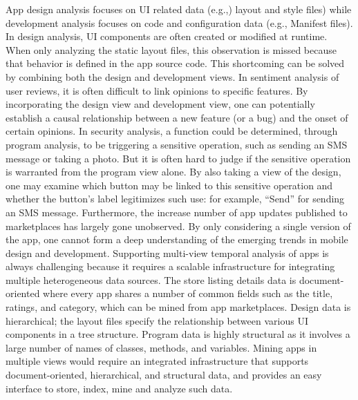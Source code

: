 App design analysis focuses on UI related data (e.g.,) layout and style files) while development analysis focuses on code and configuration data (e.g., Manifest files).
In design analysis, UI components are often created or modified at runtime.
When only analyzing the static layout files, this observation is missed because that behavior is defined in the app source code.
This shortcoming can be solved by combining both the design and development views.
In sentiment analysis of user reviews, it is often difficult to link opinions to specific features.
By incorporating the design view and development view, one can potentially establish a causal relationship between a new feature (or a bug) and the onset of certain opinions.
In security analysis, a function could be determined, through program analysis, to be triggering a sensitive operation, such as sending an SMS message or taking a photo.
But it is often hard to judge if the sensitive operation is warranted from the program view alone.
By also taking a view of the design, one may examine which button may be linked to this sensitive operation and whether the button's label legitimizes such use: for example, ``Send'' for sending an SMS message.
Furthermore, the increase number of app updates published to marketplaces has largely gone unobserved. 
By only considering a single version of the app, one cannot form a deep understanding of the emerging trends in mobile design and development.
Supporting multi-view temporal analysis of apps is always challenging because it requires a scalable infrastructure for integrating multiple heterogeneous data sources.
The store listing details data is document-oriented where every app shares a number of common fields such as the title, ratings, and category, which can be mined from app marketplaces.
Design data is hierarchical; the layout files specify the relationship between various UI components in a tree structure.
Program data is highly structural as it involves a large number of names of classes, methods, and variables.
Mining apps in multiple views would require an integrated infrastructure that supports document-oriented, hierarchical, and structural data, and provides an easy interface to store, index, mine and analyze such data.

